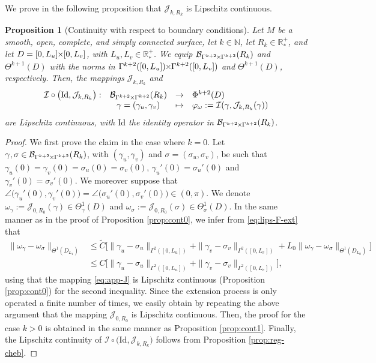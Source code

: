 \documentclass{article}
\newcommand{\I}{\mathcal{I}}
\newcommand{\PLH}{{\mkern-1mu\times\mkern-1mu}}
\newcommand{\Times}{\PLH}
\newcommand{\R}{\mathbb{R}}
\newcommand{\surf}{M}
\newcommand{\EN}{\mathbb{N}}
\newcommand{\J}{\mathcal{J}}
\newtheorem{proposition}[theorem]{Proposition}
\theoremstyle{remark}
\theoremstyle{prpart}
\newcommand{\B}{\mathcal{B}}
\newcommand{\Id}{\mathrm{Id}}
\begin{document}
We prove in the following proposition that $\J_{k,R_k}$ is Lipschitz continuous.
\begin{proposition}[Continuity with respect to boundary conditions]\label{prop:cont0-ext}
  Let $\surf$ be a smooth, open, complete, and simply connected surface, let $k\in\EN$, let $R_k\in\R_\ast^+$, and let $D=[0,L_u]\Times[0,L_v]$, with $L_u,L_v\in\R^+_\ast$. We equip $\B_{\Gamma^{k+2}\Times \Gamma^{k+2}}(R_k)$ and $\Theta^{k+1}(D)$ with the norms in $\Gamma^{k+2}([0,L_u])\Times \Gamma^{k+2}([0,L_v])$ and $\Theta^{k+1}(D)$, respectively. Then, the mappings $\J_{k,R_k}$ and 
\begin{equation*}
\begin{array}{lccl}
\I\circ \big(\Id,\J_{k,R_k}\big): &\B_{\Gamma^{k+2}\Times \Gamma^{k+2}}(R_k) &\to& \Phi^{k+2}(D)\\
  & \gamma=(\gamma_u,\gamma_v) &\mapsto& \varphi_{\omega}:=\I(\gamma,\J_{k,R_k}(\gamma))
\end{array}
\end{equation*}
 are Lipschitz continuous, with $\Id$ the identity operator in $\B_{\Gamma^{k+2}\Times \Gamma^{k+2}}(R_k)$.
\end{proposition}
\begin{proof}
We first prove the claim in the case where $k=0$. Let $\gamma,\sigma\in\B_{\Gamma^{k+2}\Times \Gamma^{k+2}}(R_k)$, with $(\gamma_u,\gamma_v)$ and $\sigma=(\sigma_u,\sigma_v)$, be such that $\gamma_u(0)=\gamma_v(0) = \sigma_u(0)=\sigma_v(0)$, $\gamma_u'(0)=\sigma_u'(0)$ and $\gamma_v'(0)=\sigma_v'(0)$. We moreover suppose that $\angle\big(\gamma_u'(0),\gamma_v'(0)\big) = \angle\big(\sigma_u'(0),\sigma_v'(0)\big)\in(0,\pi)$. We denote $\omega_\gamma:=\J_{0,R_0}(\gamma)\in\Theta^{1}_\gamma(D)$ and $\omega_\sigma:=\J_{0,R_0}(\sigma)\in\Theta^{1}_\sigma(D)$.
In the same manner as in the proof of Proposition \ref{prop:cont0}, we infer from \eqref{eq:lips-F-ext} that
\begin{align*}
  \|\omega_\gamma-\omega_\sigma\|_{\Theta^{1}(D_{L_1})}&\leq \tilde C\Big[\|\gamma_u-\sigma_u\|_{\Gamma^{2}([0,L_u])} + \|\gamma_v-\sigma_v\|_{\Gamma^{2}([0,L_v])} + L_0\|\omega_\gamma-\omega_\sigma\|_{\Theta^{1}(D_{L_0})}\Big]\\
&\leq  C\Big[\|\gamma_u-\sigma_u\|_{\Gamma^{2}([0,L_u])} + \|\gamma_v-\sigma_v\|_{\Gamma^{2}([0,L_v])}\Big],
\end{align*}
using that the mapping \eqref{eq:app-J} is Lipschitz continuous (Proposition \ref{prop:cont0}) for the second inequality. Since the extension process is only operated a finite number of times, we easily obtain by repeating the above argument that the mapping $\J_{0,R_0}$ is Lipschitz continuous. Then, the proof for the case $k>0$ is obtained in the same manner as Proposition \ref{prop:cont1}. Finally, the Lipschitz continuity of $\I\circ \big(\Id,\J_{k,R_k}\big)$ follows from Proposition \ref{prop:reg-cheb}.
\end{proof}
\end{document}
